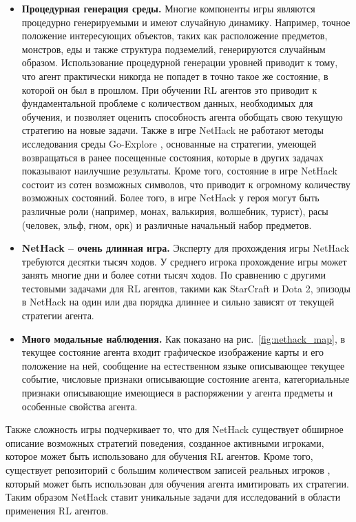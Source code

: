 \begin{itemize}
    \item \textbf{Процедурная генерация среды.} Многие компоненты игры являются процедурно генерируемыми и имеют случайную динамику. Например, точное положение интересующих объектов, таких как расположение предметов, монстров, еды и также структура подземелий, генерируются случайным образом. Использование процедурной генерации уровней приводит к тому, что агент практически никогда не попадет в точно такое же состояние, в которой он был в прошлом. При обучении RL агентов это приводит к фундаментальной проблеме с количеством данных, необходимых для обучения, и позволяет оценить способность агента обобщать свою текущую стратегию на новые задачи. Также в игре NetHack не работают методы исследования среды Go-Explore \cite{ecoffet2019, ecoffet2021}, основанные на стратегии, умеющей возвращаться в ранее посещенные состояния, которые в других задачах показывают наилучшие результаты. Кроме того, состояние в игре NetHack состоит из сотен возможных символов, что приводит к огромному количеству возможных состояний. Более того, в игре NetHack у героя могут быть различные роли (например, монах, валькирия, волшебник, турист), расы (человек, эльф, гном, орк) и различные начальный набор предметов. 
    \item \textbf{NetHack -- очень длинная игра.} Эксперту для прохождения игры NetHack требуются десятки тысяч ходов. У среднего игрока прохождение игры может занять многие дни и более сотни тысяч ходов. По сравнению с другими тестовыми задачами для RL агентов, такими как  StarCraft и Dota 2, эпизоды в NetHack на один или два порядка длиннее и сильно зависят от текущей стратегии агента. 
    \item \textbf{Много модальные наблюдения.} Как показано на рис.~\ref{fig:nethack_map}, в текущее состояние агента входит графическое изображение карты и его положение на ней, сообщение на естественном языке описывающее текущее событие, числовые признаки описывающие состояние агента, категориальные признаки описывающие имеющиеся в распоряжении у агента предметы и особенные свойства агента. 
\end{itemize}

Также сложность игры подчеркивает то, что для NetHack существует обширное описание \cite{nethack_wiki} возможных стратегий поведения, созданное активными игроками, которое может быть использовано для обучения RL агентов. Кроме того, существует репозиторий с большим количеством записей реальных игроков \cite{alt}, который может быть использован для обучения агента имитировать их стратегии. Таким образом NetHack ставит уникальные задачи для исследований в области применения RL агентов. 

